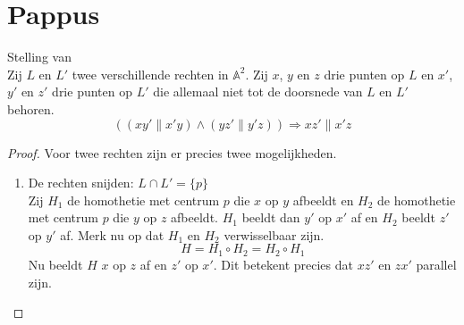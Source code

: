 \documentclass[main.tex]{subfiles}
\begin{document}
\section{Pappus}
\label{sec:pappus}

\begin{st}
  Stelling van \\
  Zij $L$ en $L'$ twee verschillende rechten in $\mathbb{A}^{2}$.
  Zij $x$, $y$ en $z$ drie punten op $L$ en $x'$, $y'$ en $z'$ drie punten op $L'$ die allemaal niet tot de doorsnede van $L$ en $L'$ behoren.
  \[
  ((xy' \parallel x'y) \wedge (yz' \parallel y'z)) \Rightarrow xz' \parallel x'z
  \]
  
  \begin{proof}
    Voor twee rechten zijn er precies twee mogelijkheden.
    \begin{enumerate}
    \item De rechten snijden: $L \cap L' = \{ p \}$\\
      Zij $H_{1}$ de homothetie met centrum $p$ die $x$ op $y$ afbeeldt en $H_{2}$ de homothetie met centrum $p$ die $y$ op $z$ afbeeldt.
      $H_{1}$ beeldt dan $y'$ op $x'$ af en $H_{2}$ beeldt $z'$ op $y'$ af.
      Merk nu op dat $H_{1}$ en $H_{2}$ verwisselbaar zijn.
      \[ H = H_{1} \circ H_{2} = H_{2} \circ H_{1} \]
      Nu beeldt $H$ $x$ op $z$ af en $z'$ op $x'$.
      Dit betekent precies dat $xz'$ en $zx'$ parallel zijn.

      \begin{figure}[H]
        \centering
\end{figure}
\end{enumerate}
\end{proof}
\end{st}
\end{document}
